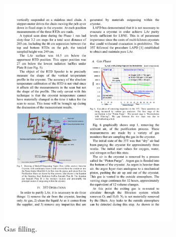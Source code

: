\begin{figure}
  \centering
  \begin{subfigure}[t]{0.48\linewidth}
    \centering
    \includegraphics[width=0.98\textwidth]{35tonGasFilling.pdf}
    \caption{Gas filling.}
    \label{fig:35tonGasFilling}
  \end{subfigure}
  \hfill
  \begin{subfigure}[t]{0.48\linewidth}
    \centering

\end{subfigure}
\end{figure}
